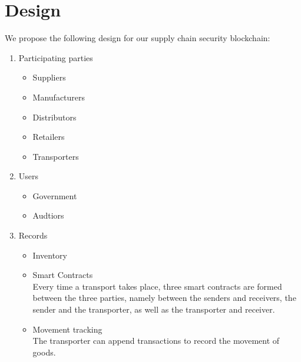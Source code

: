 \section{Design}

We propose the following design for our supply chain security blockchain:
\begin{enumerate}
    \item Participating parties
        \begin{itemize}
            \item Suppliers
            \item Manufacturers 
            \item Distributors 
            \item Retailers 
            \item Transporters
        \end{itemize} 
    \item Users 
        \begin{itemize}
            \item Government 
            \item Audtiors 
        \end{itemize}
    \item Records
        \begin{itemize}
            \item Inventory
            \item Smart Contracts \\
                Every time a transport takes place, three smart contracts are formed between the
                three parties, namely between the senders and receivers, the sender and the
                transporter, as well as the transporter and receiver. 
            \item Movement tracking \\
                The transporter can append transactions to record the movement of goods.
        \end{itemize}
\end{enumerate}

